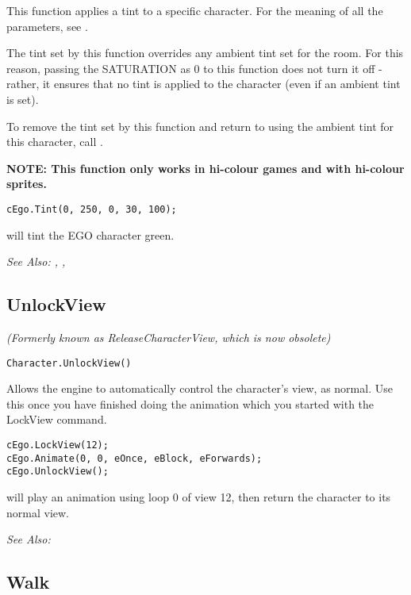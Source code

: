 This function applies a tint to a specific character. For the meaning of all the parameters,
see .

The tint set by this function overrides any ambient tint set for the room. For this
reason, passing the SATURATION as 0 to this function does not turn it off - rather, it
ensures that no tint is applied to the character (even if an ambient tint is set).

To remove the tint set by this function and return to using the ambient tint for this
character, call .

\bf{NOTE:} This function only works in hi-colour games and with hi-colour sprites.

\begin{verbatim}
cEgo.Tint(0, 250, 0, 30, 100);
\end{verbatim}
will tint the EGO character green.

\it{See Also:} ,
,


\subsection{UnlockView}\label{Character.UnlockView}%

\it{(Formerly known as ReleaseCharacterView, which is now obsolete)}

\begin{verbatim}
Character.UnlockView()
\end{verbatim}
Allows the engine to automatically control the character's view, as normal.
Use this once you have finished doing the animation which you started with
the LockView command.

\begin{verbatim}
cEgo.LockView(12);
cEgo.Animate(0, 0, eOnce, eBlock, eForwards);
cEgo.UnlockView();
\end{verbatim}
will play an animation using loop 0 of view 12, then return the character to its normal view.

\it{See Also:} 



\subsection{Walk}\label{Character.Walk}%

